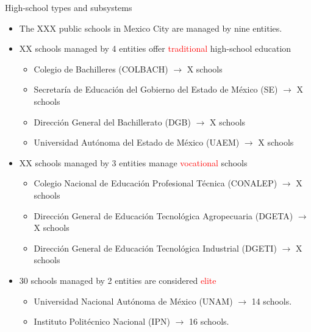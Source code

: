 \documentclass[notes,11pt, aspectratio=169]{beamer}
\begin{document}
\begin{frame}[fragile]{High-school types and subsystems}
  \begin{itemize}
    \vfill\item The XXX public schools in Mexico City are managed by nine entities.
    
\vfill\item XX schools managed by 4 entities offer \textcolor{red}{traditional} high-school education 
  \begin{itemize}
\vfill\item Colegio de Bachilleres (COLBACH) $\rightarrow$ X schools
\vfill\item Secretaría de Educación del
Gobierno del Estado de México (SE) $\rightarrow$ X schools
\vfill\item Dirección General del Bachillerato (DGB) $\rightarrow$ X schools
\vfill\item Universidad Autónoma del Estado de México (UAEM) $\rightarrow$ X schools
  \end{itemize}  
    \vfill\item XX schools managed by 3 entities manage \textcolor{red}{vocational} schools
  \begin{itemize}
\vfill\item Colegio Nacional de Educación Profesional Técnica (CONALEP) $\rightarrow$ X schools
\vfill\item Dirección General de Educación Tecnológica Agropecuaria (DGETA)  $\rightarrow$ X schools
\vfill\item Dirección General de Educación Tecnológica Industrial (DGETI)  $\rightarrow$ X schools
  \end{itemize}  

    \vfill\item 30 schools managed by 2 entities are considered \textcolor{red}{elite}
      \begin{itemize}
    \vfill\item Universidad Nacional Autónoma de México (UNAM) $\rightarrow$ 14  schools. 
    \vfill\item Instituto Politécnico Nacional (IPN) $\rightarrow$ 16 schools.
  \end{itemize} 

    
  \end{itemize}
\end{frame}
\end{document}
